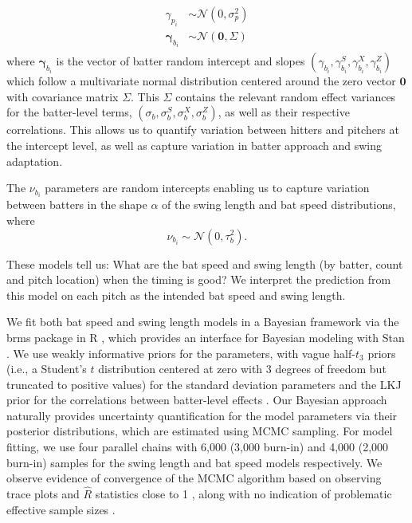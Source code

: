 \documentclass{article}
\begin{document}
    \begin{align}
        \begin{split}
            \gamma_{p_i} &\sim \mathcal{N}(0, \sigma^2_p) \\
            \boldsymbol{\gamma}_{b_i} &\sim \mathcal{N}(\boldsymbol{0}, \Sigma)
        \end{split}
    \end{align}
    where $\boldsymbol{\gamma}_{b_i}$ is the vector of batter random intercept and slopes $(\gamma_{b_i}, \gamma^S_{b_i}, \gamma^X_{b_i}, \gamma^Z_{b_i})$ which follow a multivariate normal distribution centered around the zero vector $\boldsymbol{0}$ with covariance matrix $\Sigma$. This $\Sigma$ contains the relevant random effect variances for the batter-level terms, $(\sigma_b, \sigma_b^S, \sigma_b^X, \sigma_b^Z)$, as well as their respective correlations. This allows us to quantify variation between hitters and pitchers at the intercept level, as well as capture variation in batter approach and swing adaptation.
    
    The $\nu_{b_i}$ parameters are random intercepts enabling us to capture variation between batters in the shape $\alpha$ of the swing length and bat speed distributions, where
    \begin{equation}
        \nu_{b_i} \sim \mathcal{N}(0, \tau^2_b).
    \end{equation}

    These models tell us: What are the bat speed and swing length (by batter, count and pitch location) when the timing is good? We interpret the prediction from this model on each pitch as the intended bat speed and swing length.
    
    We fit both bat speed and swing length models in a Bayesian framework via the brms package in R \citep{brms}, which provides an interface for Bayesian modeling with Stan \citep{carpenter2017stan}. We use weakly informative priors for the parameters, with vague half-$t_3$ priors (i.e., a Student's $t$ distribution centered at zero with 3 degrees of freedom but truncated to positive values) for the standard deviation parameters \citep{gelman2006prior} and the LKJ prior for the correlations between batter-level effects \cite{lewandowski2009generating}. Our Bayesian approach naturally provides uncertainty quantification for the model parameters via their posterior distributions, which are estimated using MCMC sampling. For model fitting, we use four parallel chains with 6,000 (3,000 burn-in) and 4,000 (2,000 burn-in) samples for the swing length and bat speed models respectively. We observe evidence of convergence of the MCMC algorithm based on observing trace plots and $\hat{R}$ statistics close to 1 \citep{gelman1992inference, brooks1998general}, along with no indication of problematic effective sample sizes \citep{gelman2020bayesian}. 
    
\end{document}
